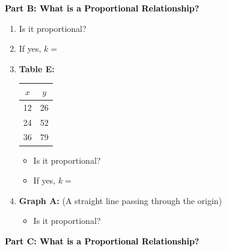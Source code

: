 \documentclass[12pt, letterpaper, fleqn]{article}
\newcommand{\blank}{\underline{\hspace{2.2cm}}}
\begin{document}
\newpage

\begin{tcolorbox}[colback=customteal!20]
\large\textcolor{black}{\textbf{Part B: What is a Proportional Relationship?}}
\end{tcolorbox}

\vspace{3mm}

\begin{enumerate}[itemsep=2.2cm, leftmargin=0.6cm, resume]
\item Is it proportional? \blank
\item If yes, $k = $ \blank
\item \textbf{Table E:}
\begin{tabular}{|c|c|}
\hline
$x$ & $y$ \\
\hline
12 & 26 \\
24 & 52 \\
36 & 79 \\
\hline
\end{tabular}

\begin{itemize}
\item Is it proportional? \blank
\item If yes, $k = $ \blank
\end{itemize}

\newpage
\item \textbf{Graph A:} (A straight line passing through the origin)
\begin{center}
\end{center}

\begin{itemize}
\item Is it proportional? \blank
\end{itemize}
\end{enumerate}

\newpage

\begin{tcolorbox}[colback=customteal!20]
\large\textcolor{black}{\textbf{Part C: What is a Proportional Relationship?}}
\end{tcolorbox}
\end{document}
